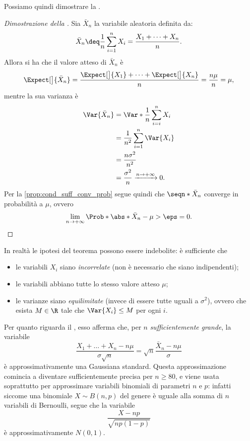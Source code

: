 Possiamo quindi dimostrare la .
\begin{proof}
    [Dimostrazione della ]
    Sia $\bar X_n$ la variabile aleatoria definita da: \[
        \bar X_n \deq \frac{1}{n}\sum_{i = 1}^{n}X_i = \frac{X_1 + \dots + X_n}{n}.
    \] Allora si ha che il valore atteso di $\bar X_n$ è \[
       \Expect[\big]{\bar X_n} = \frac{\Expect[\big]{X_1} + \dots + \Expect[\big]{X_n}}{n} = \frac{n\mu}{n} = \mu, 
    \] mentre la sua varianza è \begin{align*}
        \Var{\bar X_n} 
        &= \Var*{\frac1n \sum_{i = i}^n X_i} \\
        &= \frac{1}{n^2} \sum_{i = 1}^n \Var{X_i}\\
        &= \frac{n\sigma^2}{n^2}\\
        &= \frac{\sigma^2}{n} \xrightarrow{n \to +\infty} 0.
    \end{align*} Per la \autoref{prop:cond_suff_conv_prob} segue quindi che $\seqn*{\bar X_n}$ converge in probabilità a $\mu$, ovvero \[
        \lim_{n \to +\infty} \Prob*{\abs*{\bar X_n - \mu} > \eps} = 0. \qedhere
    \]
\end{proof}

In realtà le ipotesi del teorema possono essere indebolite: è sufficiente che 
\begin{itemize}
    \item le variabili $X_i$ siano \emph{incorrelate} (non è necessario che siano indipendenti);
    \item le variabili abbiano tutte lo stesso valore atteso $\mu$;
    \item le varianze siano \emph{equilimitate} (invece di essere tutte uguali a $\sigma^2$), ovvero che esista $M \in \R$ tale che $\Var{X_i} \leq M$ per ogni $i$.
\end{itemize}

Per quanto riguarda il , esso afferma che, per $n$ \emph{sufficientemente grande}, la variabile \[
    \frac{X_1 + \dots + X_n - n\mu}{\sigma\sqrt{n}} = \sqrt{n} \frac{\bar X_n - n\mu}{\sigma}    
\] è approssimativamente una Gaussiana standard. Questa approssimazione comincia a diventare sufficientemente precisa per $n \geq 80$, e viene usata soprattutto per approssimare variabili binomiali di parametri $n$ e $p$: infatti siccome una binomiale $X \sim B(n, p)$ del genere è uguale alla somma di $n$ variabili di Bernoulli, segue che la variabile \[
    \frac{X - np}{\sqrt{np(1-p)}}
\] è approssimativamente $N(0, 1)$.